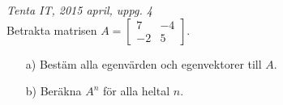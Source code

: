 {\it Tenta IT, 2015 april, uppg. 4}\\
Betrakta matrisen $A=\begin{bmatrix}7&-4\\-2&5\end{bmatrix}$.
\begin{itemize}
	\item[a) ] Bestäm alla egenvärden och egenvektorer till $A$.
	\item[b) ] Beräkna $A^n$ för alla heltal $n$.
\end{itemize}